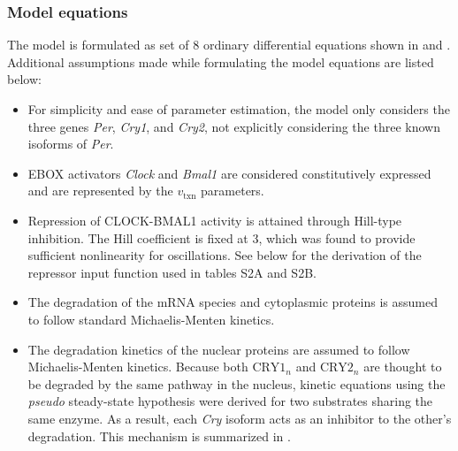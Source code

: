 \subsubsection{Model equations}
The model is formulated as set of 8 ordinary differential equations shown in  and . 
Additional assumptions made while formulating the model equations are listed below:

\begin{itemize}

  \item For simplicity and  ease of parameter estimation, the model only considers the three genes {\it Per}, {\it Cry1}, and {\it Cry2}, not explicitly considering the three known isoforms of {\it Per}. 

  \item EBOX activators {\it Clock} and {\it Bmal1} are considered constitutively expressed and are represented by the $v_{\text{txn}}$ parameters. 

  \item Repression of CLOCK-BMAL1 activity is attained through Hill-type inhibition. The Hill coefficient is fixed at 3, which was found to provide sufficient nonlinearity for oscillations. See below for the derivation of the repressor input function used in tables S2A and S2B.

  \item The degradation of the mRNA species and cytoplasmic proteins is assumed to follow standard Michaelis-Menten kinetics.

  \item The degradation kinetics of the nuclear proteins are assumed to follow Michaelis-Menten kinetics. Because both $\text{CRY1}_n$ and $\text{CRY2}_n$ are thought to be degraded by the same pathway in the nucleus, kinetic equations using the {\it pseudo} steady-state hypothesis were derived for two substrates sharing the same enzyme. As a result, each {\it Cry} isoform acts as an inhibitor to the other's degradation. This mechanism is summarized in .
\end{itemize}

